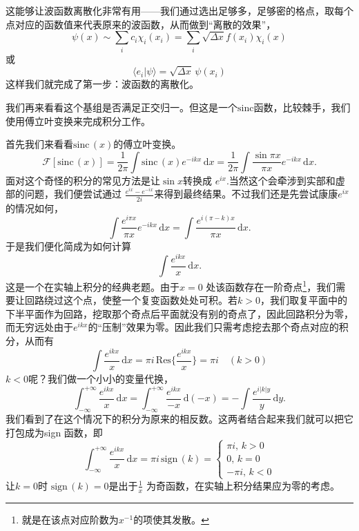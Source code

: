 \documentclass[12pt,a4paper,openany,twoside]{book}
\numberwithin{equation}{section}
\newcommand{\sinc}[1]{\mathrm{sinc} \, (#1)}
\begin{document}
      这能够让波函数离散化非常有用——我们通过选出足够多，足够密的格点，取每个点对应的函数值来代表原来的波函数，从而做到``离散的效果''，
      \begin{equation}
      	\psi(x) \sim \sum_i c_i \chi_i (x_i) = \sum_i \sqrt{\Delta x} f(x_i) \chi_i (x) 
      \end{equation}
      或
      \begin{equation}
      	\langle e_i | \psi \rangle = \sqrt{\Delta x} \,\psi(x_i) 
      \end{equation}
      这样我们就完成了第一步：波函数的离散化。

      我们再来看看这个基组是否满足正交归一。但这是一个$\mathrm{sinc}$函数，比较棘手，我们使用傅立叶变换来完成积分工作。

      首先我们来看看$\sinc{x}$的傅立叶变换。
      \[
      	\mathcal{F}[\sinc{x}] =  \frac{1}{2\pi}\int \sinc{x} e^{-ikx} \, \mathrm{d}x  = \frac{1}{2\pi} \int \frac{\sin{\pi x}}{\pi x} e^{-ikx} \, \mathrm{d}x 
      .\]
      面对这个奇怪的积分的常见方法是让$\sin{x}$转换成 $e^{ix}$.当然这个会牵涉到实部和虚部的问题，我们便尝试通过 $\frac{e^{ix}-e^{-ix}}{2i}$来得到最终结果。不过我们还是先尝试康康$e^{ix}$的情况如何，
      \[
      	\int \frac{e^{i\pi x}}{\pi x}e^{-ikx} \, \mathrm{d}x = \int \frac{e^{i(\pi -k) x}}{\pi x} \, \mathrm{d} x
      .\]
      于是我们便化简成为如何计算
      \[
      	\int \frac{e^{ikx}}{x} \, \mathrm{d}x 
      .\] 
      这是一个在实轴上积分的经典老题。由于$x=0$ 处该函数存在一阶奇点\footnote{就是在该点对应阶数为$x^{-1}$的项使其发散。}，我们需要让回路绕过这个点，使整一个复变函数处处可积。若$k>0$，我们取复平面中的下半平面作为回路，挖取那个奇点后平面就没有别的奇点了，因此回路积分为零，而无穷远处由于$e^{ikx}$的``压制''效果为零。因此我们只需考虑挖去那个奇点对应的积分，从而有
      \begin{equation}
      	\int \frac{e^{ikx}}{x} \, \mathrm{d}x =  \pi i \, \mathrm{Res}\{\frac{e^{ikx}}{x}\} = \pi i \quad (k>0)
      \end{equation}
      $k<0$呢？我们做一个小小的变量代换，
      \[
       \int_{-\infty}^{+\infty} \frac{e^{ikx}}{x} \, \mathrm{d}x = \int_{-\infty}^{+\infty} \frac{e^{ikx}}{-x} \, \mathrm{d}(-x) =- \int \frac{e^{i|k|y}}{y} \, \mathrm{d} y   
      .\] 
      我们看到了在这个情况下的积分为原来的相反数。这两者结合起来我们就可以把它打包成为sign 函数，即
      \begin{equation}
      	\int _{-\infty} ^{+\infty} \frac{e^{ikx}}{x} \, \mathrm{d}x = \pi i \, \mathrm{sign}\,(k) = 
      	\begin{cases}
      	 \pi i, \, k>0 \\
      		0, \, k=0 \\
      		-\pi i, \, k<0
      	\end{cases}
      \end{equation}
      让$k=0$时 $\mathrm{sign}\,(k)=0$是出于$\frac{1}{x}$ 为奇函数，在实轴上积分结果应为零的考虑。
\end{document}
